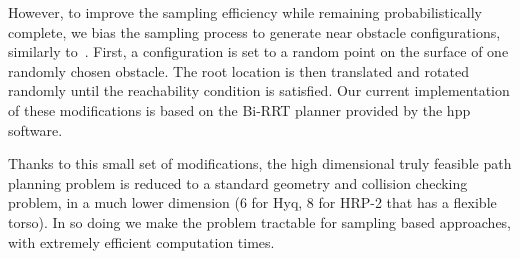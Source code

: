 However, to improve the sampling efficiency while remaining probabilistically complete, we bias the sampling process to generate near obstacle configurations, similarly to~\cite{Amato98choosinggood}.
First, a configuration is set to a random point on the surface of one randomly chosen obstacle. The root location is then translated and rotated randomly until the reachability condition is satisfied.
Our current implementation of these modifications is based on the Bi-RRT planner provided by the hpp software.

Thanks to this small set of modifications, the high dimensional truly feasible path planning problem is reduced to a standard geometry and collision checking problem, in a much lower dimension (6 for Hyq, 8 for HRP-2 that has a flexible torso). In so doing we make the problem tractable for sampling based approaches, with extremely efficient computation times.
